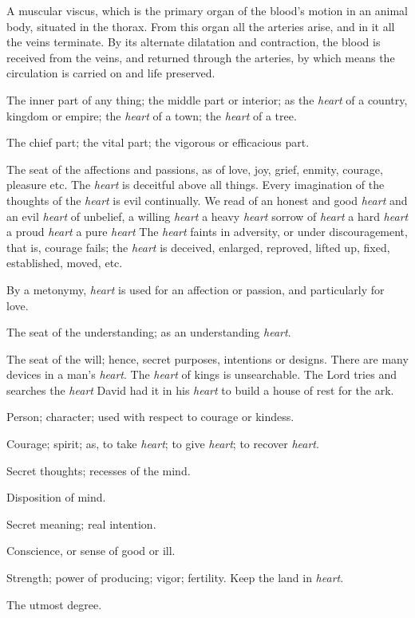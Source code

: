 	\begin{compactitem}
		\item[1] A muscular viscus, which is the primary organ of the blood's motion in an animal body, situated in the thorax. From this organ all the arteries arise, and in it all the veins terminate. By its alternate dilatation and contraction, the blood is received from the veins, and returned through the arteries, by which means the circulation is carried on and life preserved.
		\item[2] The inner part of any thing; the middle part or interior; as the \textit{heart} of a country, kingdom or empire; the \textit{heart} of a town; the \textit{heart} of a tree.
		\item[3] The chief part; the vital part; the vigorous or efficacious part.
		\item[4] The seat of the affections and passions, as of love, joy, grief, enmity, courage, pleasure etc. The \textit{heart} is deceitful above all things. Every imagination of the thoughts of the \textit{heart} is evil continually. We read of an honest and good \textit{heart} and an evil \textit{heart} of unbelief, a willing \textit{heart} a heavy \textit{heart} sorrow of \textit{heart} a hard \textit{heart} a proud \textit{heart} a pure \textit{heart} The \textit{heart} faints in adversity, or under discouragement, that is, courage fails; the \textit{heart} is deceived, enlarged, reproved, lifted up, fixed, established, moved, etc.
		\item[5] By a metonymy, \textit{heart} is used for an affection or passion, and particularly for love.
		\item[6] The seat of the understanding; as an understanding \textit{heart}.
		\item[7] The seat of the will; hence, secret purposes, intentions or designs. There are many devices in a man's \textit{heart}. The \textit{heart} of kings is unsearchable. The Lord tries and searches the \textit{heart} David had it in his \textit{heart} to build a house of rest for the ark.
		\item[8] Person; character; used with respect to courage or kindess. 
		\item[9] Courage; spirit; as, to take \textit{heart}; to give \textit{heart}; to recover \textit{heart}.
		\item[10] Secret thoughts; recesses of the mind.
		\item[11] Disposition of mind.
		\item[12] Secret meaning; real intention.
		\item[13] Conscience, or sense of good or ill.
		\item[14] Strength; power of producing; vigor; fertility. Keep the land in \textit{heart}.
		\item[15] The utmost degree.
	\end{compactitem}

